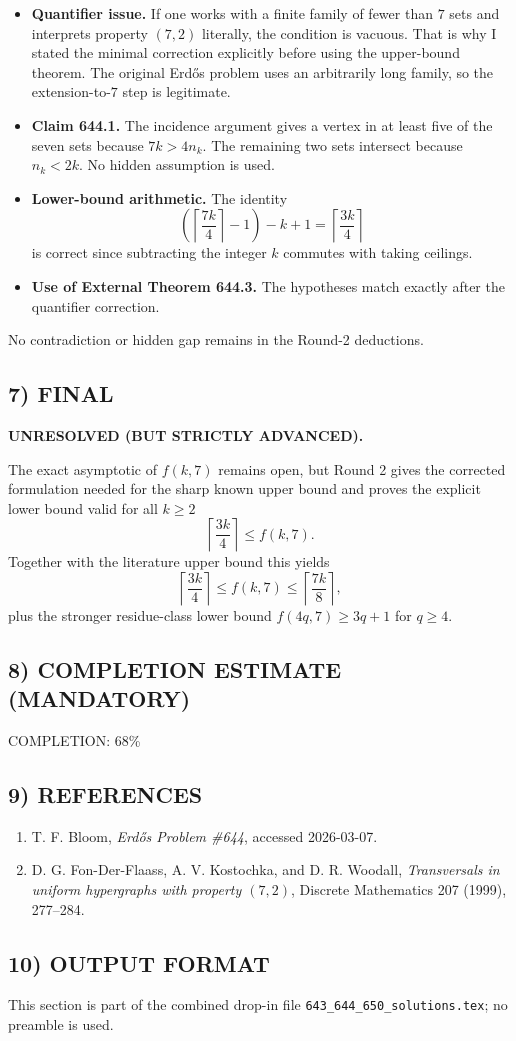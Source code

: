 \begin{itemize}
\item \textbf{Quantifier issue.}  If one works with a finite family of fewer than $7$ sets and interprets property $(7,2)$ literally, the condition is vacuous.  That is why I stated the minimal correction explicitly before using the upper-bound theorem.  The original Erd\H{o}s problem uses an arbitrarily long family, so the extension-to-$7$ step is legitimate.
\item \textbf{Claim 644.1.}  The incidence argument gives a vertex in at least five of the seven sets because $7k>4n_k$.  The remaining two sets intersect because $n_k<2k$.  No hidden assumption is used.
\item \textbf{Lower-bound arithmetic.}  The identity
\[
\left(\left\lceil\frac{7k}{4}\right\rceil-1\right)-k+1
=\left\lceil\frac{3k}{4}\right\rceil
\]
is correct since subtracting the integer $k$ commutes with taking ceilings.
\item \textbf{Use of External Theorem 644.3.}  The hypotheses match exactly after the quantifier correction.
\end{itemize}

No contradiction or hidden gap remains in the Round-2 deductions.

\subsection*{7) FINAL}
\textbf{UNRESOLVED (BUT STRICTLY ADVANCED).}

The exact asymptotic of $f(k,7)$ remains open, but Round 2 gives the corrected formulation needed for the sharp known upper bound and proves the explicit lower bound valid for all $k\ge 2$
\[
\left\lceil \frac{3k}{4}\right\rceil \le f(k,7).
\]
Together with the literature upper bound this yields
\[
\left\lceil \frac{3k}{4}\right\rceil
\le f(k,7)
\le \left\lceil \frac{7k}{8}\right\rceil,
\]
plus the stronger residue-class lower bound $f(4q,7)\ge 3q+1$ for $q\ge 4$.

\subsection*{8) COMPLETION ESTIMATE (MANDATORY)}
COMPLETION: 68\%

\subsection*{9) REFERENCES}
\begin{enumerate}
\item T. F. Bloom, \emph{Erd\H{o}s Problem \#644}, accessed 2026-03-07.
\item D. G. Fon-Der-Flaass, A. V. Kostochka, and D. R. Woodall, \emph{Transversals in uniform hypergraphs with property $(7,2)$}, Discrete Mathematics 207 (1999), 277--284.
\end{enumerate}

\subsection*{10) OUTPUT FORMAT}
This section is part of the combined drop-in file \texttt{643\_644\_650\_solutions.tex}; no preamble is used.


